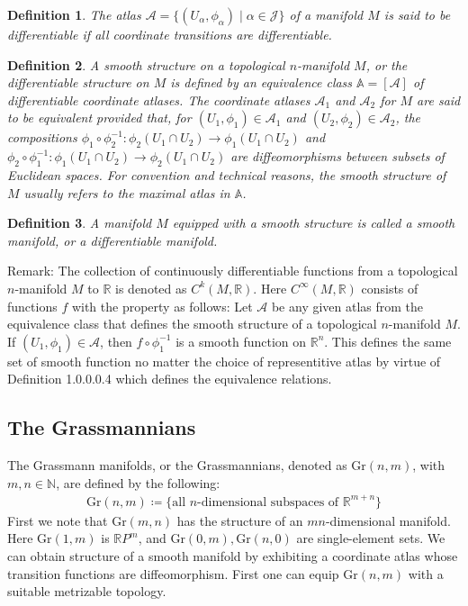 \documentclass[11pt]{book}
\theoremstyle{break}
\theoremstyle{break}
\newtheorem{defn}{Definition}[corL]
\newcommand{\R}{\mathbb{R}}
\newcommand{\N}{\mathbb{N}}
\newcommand{\remark}{\color{blue}Remark: \color{black}}
\begin{document}
\begin{defn}
The atlas $\mathcal{A}= \{(U_\alpha, \phi_\alpha)\mid \alpha \in \mathcal{J}\}$ of a manifold $M$ is said to be differentiable if all coordinate transitions are differentiable. 
\end{defn}


\begin{defn}
A smooth structure on a topological $n$-manifold $M$, or the differentiable structure on $M$ is defined by an equivalence class $\mathbb{A} = [\mathcal{A}]$ of differentiable coordinate atlases. The coordinate atlases $\mathcal{A}_1$ and $\mathcal{A}_2$ for $M$ are said to be equivalent provided that, for $(U_1,\phi_1) \in \mathcal{A}_1$ and $(U_2,\phi_2) \in \mathcal{A}_2$, the compositions $\phi_1 \circ \phi_2^{-1}: \phi_2(U_1 \cap U_2) \to \phi_1(U_1 \cap U_2)$ and $\phi_2 \circ \phi_1^{-1}: \phi_1(U_1 \cap U_2) \to \phi_2(U_1 \cap U_2)$ are diffeomorphisms between subsets of Euclidean spaces. For convention and technical reasons, the smooth structure of $M$ usually refers to the maximal atlas in $\mathbb{A}$. 
\end{defn}

\begin{defn}
A manifold $M$ equipped with a smooth structure is called a smooth manifold, or a differentiable manifold. 
\end{defn}


\remark The collection of continuously differentiable functions from a topological $n$-manifold $M$ to $\R$ is denoted as $C^k(M,\R)$. Here $C^\infty(M,\R)$ consists of functions $f$ with the property as follows: Let $\mathcal{A}$ be any given atlas from the equivalence class that defines the smooth structure of a topological $n$-manifold $M$. If $(U_1,\phi_1) \in \mathcal{A}$, then $f\circ \phi_1^{-1}$ is a smooth function on $\R^n$. This defines the same set of smooth function no matter the choice of representitive atlas by virtue of Definition 1.0.0.0.4 which defines the equivalence relations. \\



\subsection{The Grassmannians}
The Grassmann manifolds, or the Grassmannians, denoted as $\text{Gr}(n,m)$, with $m,n\in \N$, are defined by the following:
\begin{align*}
\text{Gr}(n,m)\coloneqq \{ \text{all }n\text{-dimensional subspaces of }\R^{m+n}\}
\end{align*}
First we note that $\text{Gr}(m,n)$ has the structure of an $mn$-dimensional manifold. Here $\text{Gr}(1,m)$ is $\R P^m$, and $\text{Gr}(0,m), \text{Gr}(n,0)$ are single-element sets. We can obtain structure of a smooth manifold by exhibiting a coordinate atlas whose transition functions are diffeomorphism. First one can equip $\text{Gr}(n,m)$ with a suitable metrizable topology. \\
\end{document}
